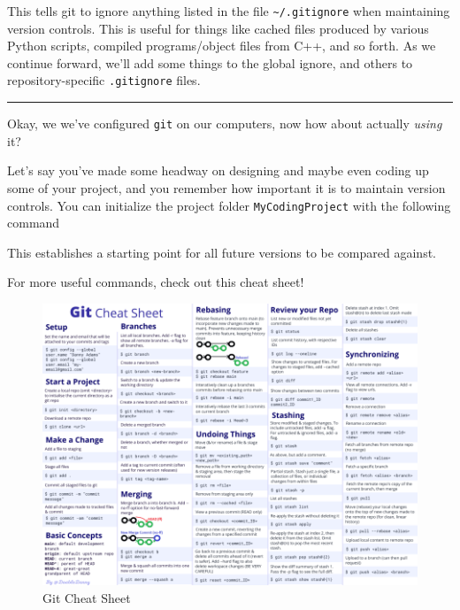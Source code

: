 This tells git to ignore anything listed in the file
\texttt{\textasciitilde{}/.gitignore} when maintaining version controls.
This is useful for things like cached files produced by various Python
scripts, compiled programs/object files from C++, and so forth. As we
continue forward, we'll add some things to the global ignore, and others
to repository-specific \texttt{.gitignore} files.

\begin{center}\rule{0.5\linewidth}{0.5pt}\end{center}

Okay, we we've configured \texttt{git} on our computers, now how about
actually \emph{using} it?

Let's say you've made some headway on designing and maybe even coding up
some of your project, and you remember how important it is to maintain
version controls. You can initialize the project folder
\texttt{MyCodingProject} with the following command

\begin{Shaded}
\begin{Highlighting}[]
\end{Highlighting}
\end{Shaded}

This establishes a starting point for all future versions to be compared
against.

For more useful commands, check out this cheat sheet!

\begin{figure}
\centering
\includegraphics{Images/GitCheatSheet.png}
\caption{Git Cheat Sheet}
\end{figure}
\FloatBarrier

